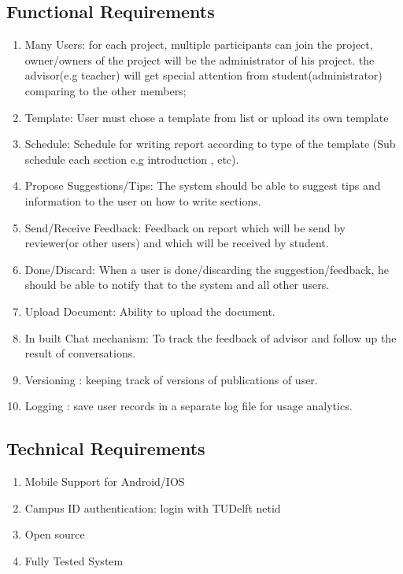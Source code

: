  \subsection{Functional Requirements} %
\label{sub:functional_requirement}
\begin{enumerate}
	\item Many Users: for each project, multiple participants can join the project, owner/owners of the project will be the administrator of his project. the advisor(e.g teacher) will get special attention from student(administrator) comparing to the other members;
	\item Template: User must chose a template from list or upload its own template
	\item Schedule: Schedule for writing report according to type of the template  (Sub schedule each section e.g introduction , etc).
	\item Propose Suggestions/Tips: The system should be able to suggest tips and information to the user on how to write sections.
	\item Send/Receive Feedback: Feedback on report which will be send by reviewer(or other users) and which will be received by student.
	\item Done/Discard: When a user is done/discarding the suggestion/feedback, he should be able to notify that to the system and all other users. 
	\item Upload Document: Ability to upload the document.
	\item In built Chat mechanism: To track the feedback of advisor and follow up the result of conversations. 
	\item Versioning : keeping track of versions of publications of user.
	\item Logging : save user records in a separate log file for usage analytics.
\end{enumerate}

\subsection{Technical Requirements} %
\label{sub:technical_requirements}
\begin{enumerate}
	\item Mobile Support for Android/IOS
	\item Campus ID authentication: login with TUDelft netid
	\item Open source
 	\item Fully Tested System 
	 
\end{enumerate}


